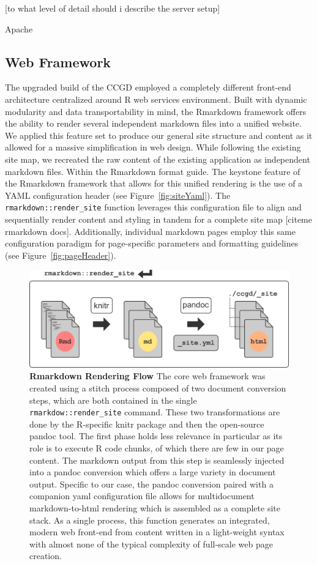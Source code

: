\documentclass[10pt]{report}
\begin{document}
[to what level of detail should i describe the server setup]

Apache

\subsection{Web Framework}
The upgraded build of the CCGD employed a completely different front-end architecture centralized around R web services environment. Built with dynamic modularity and data transportability in mind, the Rmarkdown framework offers the ability to render several independent markdown files into a unified website. We applied this feature set to produce our general site structure and content as it allowed for a massive simplification in web design. While following the existing site map, we recreated the raw content of the existing application as independent markdown files. Within the Rmarkdown format guide. The keystone feature of the Rmarkdown framework that allows for this unified rendering is the use of a YAML configuration header (see Figure~\ref{fig:siteYaml}). The \texttt{rmarkdown::render\_site} function leverages this configuration file to align and sequentially render content and styling in tandem for a complete site map [citeme rmarkdown docs]. Additionally, individual markdown pages employ this same configuration paradigm for page-specific parameters and formatting guidelines (see Figure~\ref{fig:pageHeader}).

\begin{figure}[H]
    \includegraphics[width=\linewidth]{fig/rmarkdown_flow.png}
    \caption[Rmarkdown Rendering Flow]{\textbf{Rmarkdown Rendering Flow} The core web framework was created using a stitch process composed of two document conversion steps, which are both contained in the single \texttt{rmarkdow::render\_site} command. These two transformations are done by the R-specific knitr package and then the open-source pandoc tool. The first phase holds less relevance in particular as its role is to execute R code chunks, of which there are few in our page content. The markdown output from this step is seamlessly injected into a pandoc conversion which offers a large variety in document output. Specific to our case, the pandoc conversion paired with a companion yaml configuration file allows for multidocument markdown-to-html rendering which is assembled as a complete site stack. As a single process, this function generates an integrated, modern web front-end from content written in a light-weight syntax with almost none of the typical complexity of full-scale web page creation.}\label{fig:renderFlow}
\end{figure}
\end{document}
